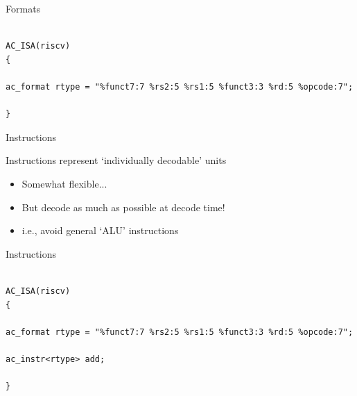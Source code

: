 \begin{frame}[fragile]{Formats}

\begin{lstlisting}

AC_ISA(riscv)
{

ac_format rtype = "%funct7:7 %rs2:5 %rs1:5 %funct3:3 %rd:5 %opcode:7";

}

\end{lstlisting}

\end{frame}

\begin{frame}{Instructions}

Instructions represent `individually decodable' units
\begin{itemize}
\item Somewhat flexible...
\item<2-> But decode as much as possible at decode time!
\item<3-> i.e., avoid general `ALU' instructions
\end{itemize}

\end{frame}

\begin{frame}[fragile]{Instructions}

\begin{lstlisting}

AC_ISA(riscv)
{

ac_format rtype = "%funct7:7 %rs2:5 %rs1:5 %funct3:3 %rd:5 %opcode:7";

ac_instr<rtype> add;

}

\end{lstlisting}
\end{frame}

